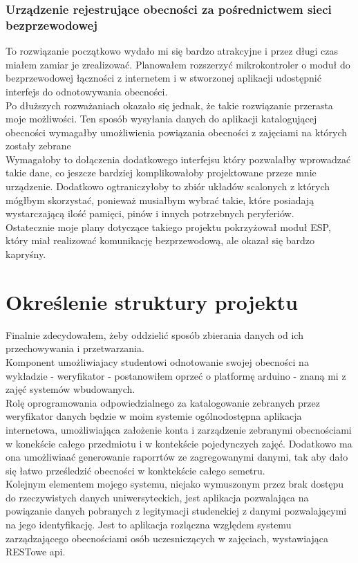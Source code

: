 \documentclass[declaration,shortabstract, mgr]{iithesis}
\begin{document}
\subsection{Urządzenie rejestrujące obecności za pośrednictwem sieci bezprzewodowej}
To rozwiązanie początkowo wydało mi się bardzo atrakcyjne i przez długi czas miałem zamiar je zrealizować. Planowałem rozszerzyć mikrokontroler o moduł do bezprzewodowej łączności z internetem i w stworzonej aplikacji udostępnić interfejs do odnotowywania obecności. \\
\indent Po dłuższych rozważaniach okazało się jednak, że takie rozwiązanie przerasta moje możliwości. Ten sposób wysyłania danych do aplikacji katalogującej obecności  wymagałby umożliwienia powiązania obecności z zajęciami na których zostały zebrane \\
\indent Wymagałoby to dołączenia dodatkowego interfejsu który pozwalałby wprowadzać takie dane, co jeszcze bardziej komplikowałoby projektowane przeze mnie urządzenie. Dodatkowo ogtraniczyłoby to zbiór układów scalonych z których mógłbym skorzystać, ponieważ musiałbym wybrać takie, które posiadają wystarczającą ilość pamięci, pinów i innych potrzebnych peryferiów. \\
\indent Ostatecznie moje plany dotyczące takiego projektu pokrzyżował moduł ESP, który miał realizować komunikację bezprzewodową, ale okazał się bardzo kapryśny.

\chapter{Określenie struktury projektu}
\indent Finalnie zdecydowałem, żeby oddzielić sposób zbierania danych od ich przechowywania i przetwarzania. \\
\indent Komponent umożliwiajacy studentowi odnotowanie swojej obecności na wykładzie - weryfikator - postanowiłem oprzeć o platformę arduino - znaną mi z zajęć systemów wbudowanych. \\
\indent Rolę oprogramowania odpowiedzialnego za katalogowanie zebranych przez weryfikator danych będzie w moim systemie ogólnodostępna aplikacja internetowa, umożliwiająca założenie konta i zarządzenie zebranymi obecnościami w konekście całego przedmiotu  i w kontekście pojedynczych zajęć. Dodatkowo ma ona umożliwiaać generowanie raporrtów ze zagregowanymi danymi, tak aby dało się łatwo prześledzić obecności w konktekście całego semetru. \\
\indent Kolejnym elementem mojego systemu, niejako wymuszonym przez brak dostępu do rzeczywistych danych uniwersyteckich, jest aplikacja pozwalająca na powiązanie danych pobranych z legitymacji studenckiej z danymi pozwalającymi na jego identyfikację. Jest to aplikacja rozlączna względem systemu zarządzającego obecnościami osób uczesniczących w zajęciach, wystawiająca RESTowe api. 
\end{document}
